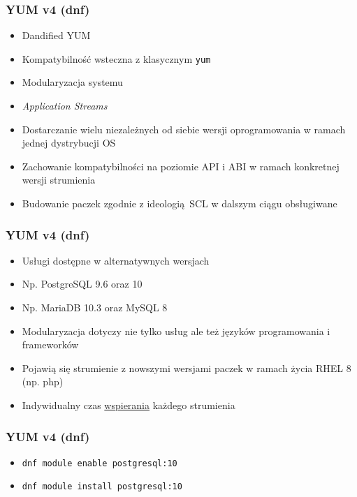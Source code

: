 \documentclass[dvipsnames,table]{beamer}
\begin{document}
\begin{frame}
\frametitle{YUM v4 (dnf)}
\begin{itemize}
	\item Dandified YUM
	\item Kompatybilność wsteczna z klasycznym {\tt yum}
	\item Modularyzacja systemu
	\item {\em Application Streams}
	\item Dostarczanie wielu niezależnych od siebie wersji oprogramowania w ramach jednej dystrybucji OS
	\item Zachowanie kompatybilności na poziomie API i ABI w ramach konkretnej wersji strumienia
	\item Budowanie paczek zgodnie z ideologią SCL w dalszym ciągu obsługiwane
\end{itemize}
\begin{center}
\end{center}
\end{frame}

\begin{frame}
\frametitle{YUM v4 (dnf)}
\begin{itemize}
	\item Usługi dostępne w alternatywnych wersjach
	\item Np. PostgreSQL 9.6 oraz 10
	\item Np. MariaDB 10.3 oraz MySQL 8
	\item Modularyzacja dotyczy nie tylko usług ale też języków programowania i frameworków
	\item Pojawią się strumienie z nowszymi wersjami paczek w ramach życia RHEL 8 (np. php)
	\item Indywidualny czas \href{https://access.redhat.com/node/4079021}{wspierania} każdego strumienia
\end{itemize}
\end{frame}

\begin{frame}
\frametitle{YUM v4 (dnf)}
\begin{itemize}
	\item {\tt dnf module enable postgresql:10}
	\item {\tt dnf module install postgresql:10}
\end{itemize}

\end{frame}


\end{document}
